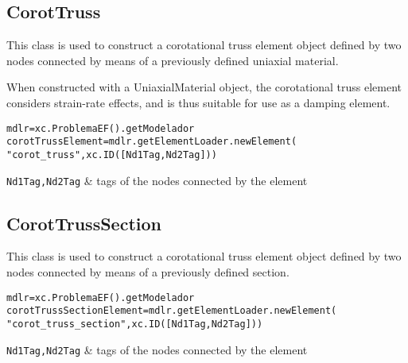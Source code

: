 \subsection{CorotTruss}
This class is used to construct a corotational truss element object defined by two nodes connected by means of a previously defined uniaxial material.

When constructed with a UniaxialMaterial object, the corotational truss element considers strain-rate effects, and is thus suitable for use as a damping element.
\begin{verbatim}
mdlr=xc.ProblemaEF().getModelador
corotTrussElement=mdlr.getElementLoader.newElement(
"corot_truss",xc.ID([Nd1Tag,Nd2Tag]))
\end{verbatim}
\begin{paramFuncTable}
{\tt Nd1Tag,Nd2Tag} & tags of the nodes connected by the element\\
\end{paramFuncTable}

\begin{paramClassTable}
\ElementParam{}
\ElementOneDParam{}
\CorotTrussParam{}
\end{paramClassTable}

\begin{methodsTable}
\ElementMeth{}
\ElementOneDMeth{}
\ProtoTrussMeth{}
\CorotTrussMeth{}
\end{methodsTable}

\subsection{CorotTrussSection}
This class is used to construct a corotational truss element object defined by two nodes connected by means of a previously defined section.

\begin{verbatim}
mdlr=xc.ProblemaEF().getModelador
corotTrussSectionElement=mdlr.getElementLoader.newElement(
"corot_truss_section",xc.ID([Nd1Tag,Nd2Tag]))
\end{verbatim}
\begin{paramFuncTable}
{\tt Nd1Tag,Nd2Tag} & tags of the nodes connected by the element\\
\end{paramFuncTable}

\begin{paramClassTable}
\ElementParam{}
\ElementOneDParam{}
\end{paramClassTable}

